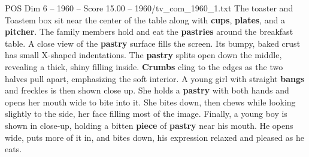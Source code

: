 \begin{textsample}{POS Dim 6 – 1960 – Score 15.00 – 1960/tv\_com\_1960\_1.txt}
The toaster and Toastem box sit near the center of the table along with \textbf{cups}, \textbf{plates}, and a \textbf{pitcher}.
The family members hold and eat the \textbf{pastries} around the breakfast table.
A close view of the \textbf{pastry} surface fills the screen.
Its bumpy, baked crust has small X-shaped indentations.
The \textbf{pastry} splits open down the middle, revealing a thick, shiny filling inside. \textbf{Crumbs} cling to the edges as the two halves pull apart, emphasizing the soft interior.
A young girl with straight \textbf{bangs} and freckles is then shown close up.
She holds a \textbf{pastry} with both hands and opens her mouth wide to bite into it.
She bites down, then chews while looking slightly to the side, her face filling most of the image.
Finally, a young boy is shown in close-up, holding a bitten \textbf{piece} of \textbf{pastry} near his mouth.
He opens wide, puts more of it in, and bites down, his expression relaxed and pleased as he eats.

\end{textsample}
